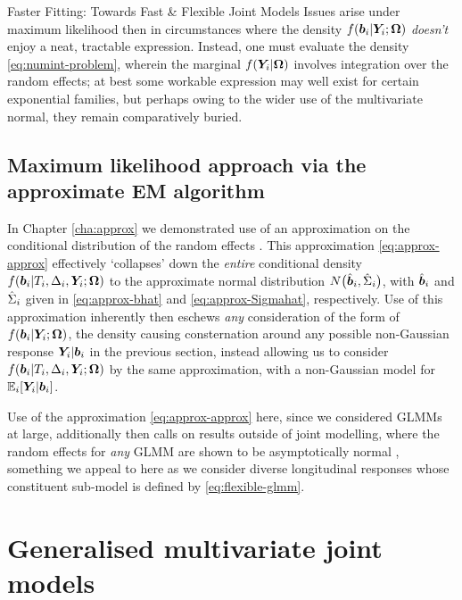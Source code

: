 \begin{chapter}{\label{cha:flexible}Faster Fitting: Towards Fast \& Flexible Joint Models}
Issues arise under maximum likelihood then in circumstances where the density $f\!\left(\bm{b}_i|\bm{Y}_i;\bm{\mathrm{\Omega}}\right)$ \textit{doesn't} enjoy a neat, tractable expression. Instead, one must evaluate the density \eqref{eq:numint-problem}, wherein the marginal $f\!\left(\bm{Y}_i|\bm{\mathrm{\Omega}}\right)$ involves integration over the random effects; at best some workable expression may well exist for certain exponential families, but perhaps owing to the wider use of the multivariate normal, they remain comparatively buried. 

\subsection{Maximum likelihood approach via the approximate EM algorithm}\label{sec:flexible-intro-bernhardt}
In Chapter \ref{cha:approx} we demonstrated use of an approximation on the conditional distribution of the random effects \citep{Bernhardt15, Murray2022}. This approximation \eqref{eq:approx-approx} effectively `collapses' down the \textit{entire} conditional density $f\!\left(\bm{b}_i|T_i, \Delta_i, \bm{Y}_i; \bm{\mathrm{\Omega}}\right)$ to the approximate normal distribution $N\big(\hat{\bm{b}}_i,\hat{\Sigma}_i\big)$, with $\hat{\bm{b}}_i$ and $\hat{\Sigma}_i$ given in \eqref{eq:approx-bhat} and \eqref{eq:approx-Sigmahat}, respectively. Use of this approximation inherently then eschews \textit{any} consideration of the form of $f\!\left(\bm{b}_i|\bm{Y}_i;\bm{\mathrm{\Omega}}\right)$, the density causing consternation around any possible non-Gaussian response $\bm{Y}_i|\bm{b}_i$ in the previous section, instead allowing us to consider $f\!\left(\bm{b}_i|T_i, \Delta_i, \bm{Y}_i; \bm{\mathrm{\Omega}}\right)$ by the same approximation, with a non-Gaussian model for $\mathbb{E}_i\!\left[\bm{Y}_i|\bm{b}_i\right]$. 

Use of the approximation \eqref{eq:approx-approx} here, since we considered GLMMs at large, additionally then calls on results outside of joint modelling, where the random effects for \textit{any} GLMM are shown to be asymptotically normal \citep{baghishani2012}, something we appeal to here as we consider diverse longitudinal responses whose constituent sub-model is defined by \eqref{eq:flexible-glmm}.

\section{Generalised multivariate joint models}\label{sec:flexible-gmvjm}

\end{chapter}
